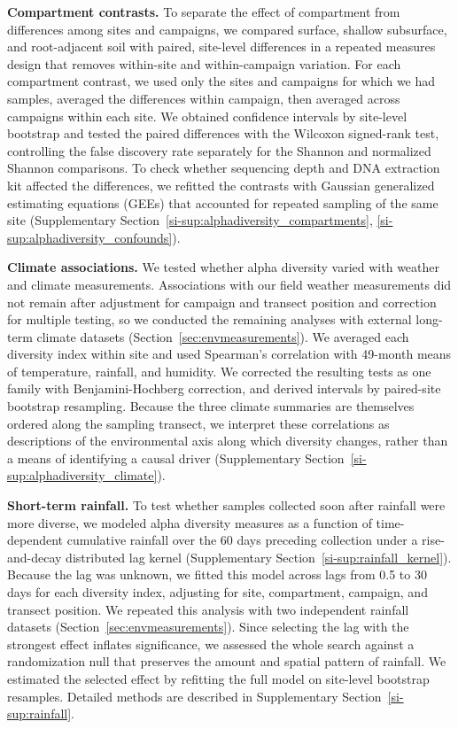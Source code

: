 \documentclass[fleqn,10pt,numbers]{olplainarticle}
\begin{document}
\textbf{Compartment contrasts.} To separate the effect of compartment from differences among sites and campaigns, we compared surface, shallow subsurface, and root-adjacent soil with paired, site-level differences in a repeated measures design that removes within-site and within-campaign variation. For each compartment contrast, we used only the sites and campaigns for which we had samples, averaged the differences within campaign, then averaged across campaigns within each site. We obtained confidence intervals by site-level bootstrap and tested the paired differences with the Wilcoxon signed-rank test, controlling the false discovery rate separately for the Shannon and normalized Shannon comparisons. To check whether sequencing depth and DNA extraction kit affected the differences, we refitted the contrasts with Gaussian generalized estimating equations (GEEs) that accounted for repeated sampling of the same site (Supplementary Section~\ref{si-sup:alphadiversity_compartments}, \ref{si-sup:alphadiversity_confounds}).


\textbf{Climate associations.} We tested whether alpha diversity varied with weather and climate measurements. Associations with our field weather measurements did not remain after adjustment for campaign and transect position and correction for multiple testing, so we conducted the remaining analyses with external long-term climate datasets (Section~\ref{sec:envmeasurements}). We averaged each diversity index within site and used Spearman's correlation with 49-month means of temperature, rainfall, and humidity. We corrected the resulting tests as one family with Benjamini-Hochberg correction, and derived intervals by paired-site bootstrap resampling. Because the three climate summaries are themselves ordered along the sampling transect, we interpret these correlations as descriptions of the environmental axis along which diversity changes, rather than a means of identifying a causal driver (Supplementary Section~\ref{si-sup:alphadiversity_climate}).


\textbf{Short-term rainfall.} To test whether samples collected soon after rainfall were more diverse, we modeled alpha diversity measures as a function of time-dependent cumulative rainfall over the 60 days preceding collection under a rise-and-decay distributed lag kernel (Supplementary Section~\ref{si-sup:rainfall_kernel}). Because the lag was unknown, we fitted this model across lags from 0.5 to 30 days for each diversity index, adjusting for site, compartment, campaign, and transect position. We repeated this analysis with two independent rainfall datasets (Section~\ref{sec:envmeasurements}). Since selecting the lag with the strongest effect inflates significance, we assessed the whole search against a randomization null that preserves the amount and spatial pattern of rainfall. We estimated the selected effect by refitting the full model on site-level bootstrap resamples. Detailed methods are described in Supplementary Section~\ref{si-sup:rainfall}.
\end{document}
